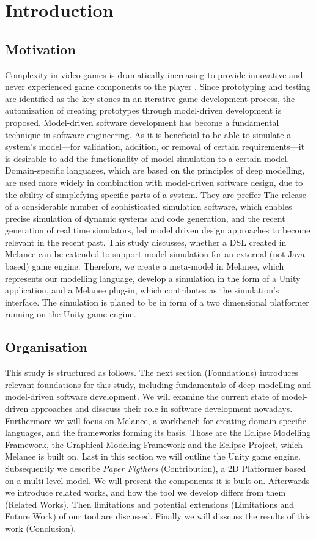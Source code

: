 
\chapter{Introduction}
\section{Motivation}
Complexity in video games is dramatically increasing to provide innovative and never experienced game components to the player \cite{Blow:2004:GDH:971564.971590}. Since prototyping and testing are identified as the key stones in an iterative game development process, the automization of creating prototypes through model-driven development is proposed\cite{reyno2009automatic}. Model-driven software development has become a fundamental technique in software engineering. As it is beneficial to be able to simulate a system's model---for validation, addition, or removal of certain requirements---it is desirable to add the functionality of model simulation to a certain model. Domain-specific languages, which are based on the principles of deep modelling, are used more widely in combination with model-driven software design, due to the ability of simplefying specific parts of a system. They are preffer The release of a considerable number of sophisticated simulation software, which enables precise simulation of dynamic systems and code generation, and the recent generation of real time simulators, led model driven design approaches to become relevant in the recent past. This study discusses, whether a DSL created in Melanee can be extended to support model simulation for an external (not Java based) game engine. Therefore, we create a meta-model in Melanee, which represents our modelling language, develop a simulation in the form of a Unity application, and a Melanee plug-in, which contributes as the simulation's interface. The simulation is planed to be in form of a two dimensional platformer running on the Unity game engine.
\section{Organisation}
This study is structured as follows.
The next section (Foundations) introduces relevant foundations for this study, including fundamentals of deep modelling and model-driven software development. We will examine the current state of model-driven approaches and disscuss their role in software development nowadays. Furthermore we will focus on Melanee, a workbench for creating domain specific languages, and the frameworks forming its basis. Those are the Eclipse Modelling Framework, the Graphical Modeling Framework and the Eclipse Project, which  Melanee is built on. Last in this section we will outline the Unity game engine. Subsequently we describe \textit{Paper Figthers} (Contribution), a 2D Platformer based on a multi-level model.  We will present the components it is built on. Afterwards we introduce related works, and how the tool we develop differs from them (Related Works). Then limitations and potential extensions (Limitations and Future Work) of our tool are discussed. Finally we will disscuss the results of this work (Conclusion).
